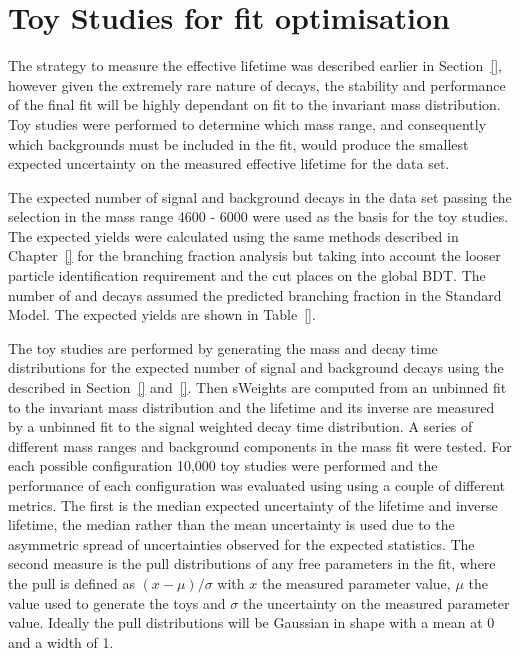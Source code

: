 {\section{Toy Studies for fit optimisation}
\label{sec:toys}
The strategy to measure the \bsmumu effective lifetime was described earlier in Section~\ref{}, however given the extremely rare nature of \bsmumu decays, the stability and performance of the final fit will be highly dependant on \ml fit to the invariant mass distribution. Toy studies were performed to determine which mass range, and consequently which backgrounds must be included in the \ml fit, would produce the smallest expected uncertainty on the measured effective lifetime for the data set. 

The expected number of signal and background decays in the data set passing the \bsmumu selection in the mass range 4600 - 6000 \mevcc were used as the basis for the toy studies. The expected yields were calculated using the same methods described in Chapter~\ref{} for the \bmumu branching fraction analysis but taking into account the looser particle identification requirement and the cut places on the global BDT. The number of \bsmumu and \bdmumu decays assumed the predicted branching fraction in the Standard Model. The expected yields are shown in Table~\ref{}. 

The toy studies are performed by generating the mass and decay time distributions for the expected number of signal and background decays using the \pdfs described in Section~\ref{} and~\ref{}. Then sWeights are computed from an unbinned \ml fit to the invariant mass distribution and the lifetime and its inverse are measured by a unbinned \ml fit to the signal weighted decay time distribution. A series of different mass ranges and background components in the mass fit were tested. For each possible configuration 10,000 toy studies were performed and the performance of each configuration was evaluated using using a couple of different metrics. The first is the median expected uncertainty of the \bsmumu lifetime and inverse lifetime, the median rather than the mean uncertainty is used due to the asymmetric spread of uncertainties observed for the expected statistics. The second measure is the pull distributions of any free parameters in the fit, where the pull is defined as $(x - \mu)/\sigma$ with $x$ the measured parameter value, $\mu$ the value used to generate the toys and $\sigma$ the uncertainty on the measured parameter value. Ideally the pull distributions will be Gaussian in shape with a mean at 0 and a width of 1.

}
